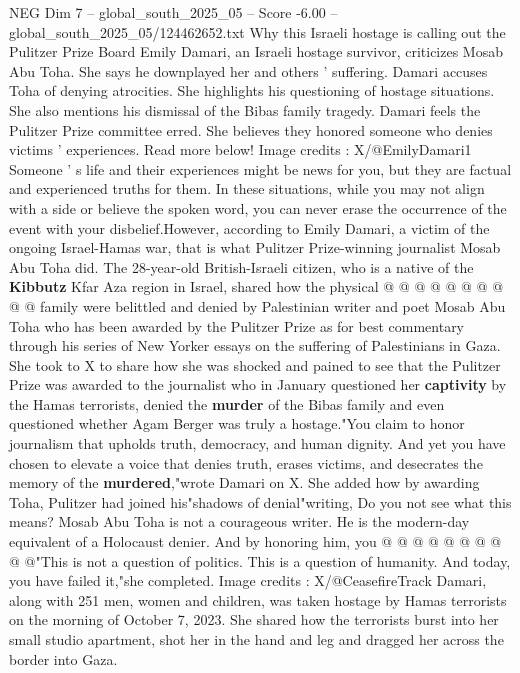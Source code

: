 \begin{textsample}{NEG Dim 7 – global\_south\_2025\_05 – Score -6.00 – global\_south\_2025\_05/124462652.txt}  \label{ex:f7_neg_213}
Why this Israeli hostage is calling out the Pulitzer Prize Board Emily Damari, an Israeli hostage survivor, criticizes Mosab Abu Toha.
She says he downplayed her and others ' suffering.
Damari accuses Toha of denying atrocities.
She highlights his questioning of hostage situations.
She also mentions his dismissal of the Bibas family tragedy.
Damari feels the Pulitzer Prize committee erred.
She believes they honored someone who denies victims ' experiences.
Read more below!
Image credits : X/@EmilyDamari1 Someone ' s life and their experiences might be news for you, but they are factual and experienced truths for them.
In these situations, while you may not align with a side or believe the spoken word, you can never erase the occurrence of the event with your disbelief.However, according to Emily Damari, a victim of the ongoing Israel-Hamas war, that is what Pulitzer Prize-winning journalist Mosab Abu Toha did.
The 28-year-old British-Israeli citizen, who is a native of the \textbf{Kibbutz} Kfar Aza region in Israel, shared how the physical @ @ @ @ @ @ @ @ @ @ family were belittled and denied by Palestinian writer and poet Mosab Abu Toha who has been awarded by the Pulitzer Prize as for best commentary through his series of New Yorker essays on the suffering of Palestinians in Gaza.
She took to X to share how she was shocked and pained to see that the Pulitzer Prize was awarded to the journalist who in January questioned her \textbf{captivity} by the Hamas terrorists, denied the \textbf{murder} of the Bibas family and even questioned whether Agam Berger was truly a hostage."You claim to honor journalism that upholds truth, democracy, and human dignity.
And yet you have chosen to elevate a voice that denies truth, erases victims, and desecrates the memory of the \textbf{murdered},"wrote Damari on X.
She added how by awarding Toha, Pulitzer had joined his"shadows of denial"writing, Do you not see what this means?
Mosab Abu Toha is not a courageous writer.
He is the modern-day equivalent of a Holocaust denier.
And by honoring him, you @ @ @ @ @ @ @ @ @ @"This is not a question of politics.
This is a question of humanity.
And today, you have failed it,"she completed.
Image credits : X/@CeasefireTrack Damari, along with 251 men, women and children, was taken hostage by Hamas terrorists on the morning of October 7, 2023.
She shared how the terrorists burst into her small studio apartment, shot her in the hand and leg and dragged her across the border into Gaza.

\end{textsample}
